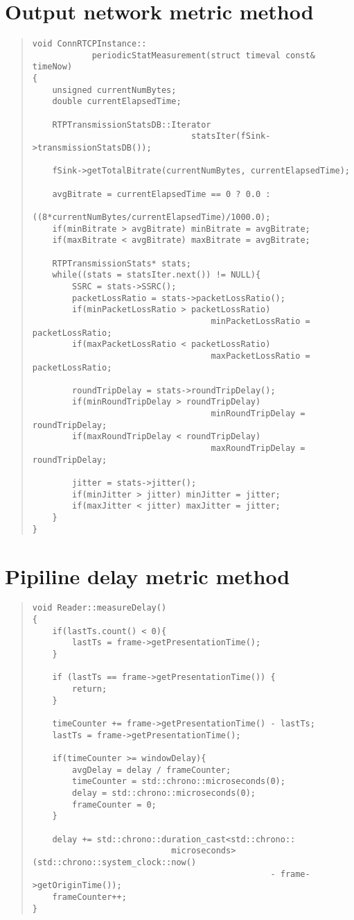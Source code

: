 \section{Output network metric method}\label{onmm}


\begin{quote}
\begin{verbatim}
void ConnRTCPInstance::
			periodicStatMeasurement(struct timeval const& timeNow) 
{
    unsigned currentNumBytes;
    double currentElapsedTime;

    RTPTransmissionStatsDB::Iterator 
    							statsIter(fSink->transmissionStatsDB());

    fSink->getTotalBitrate(currentNumBytes, currentElapsedTime);

    avgBitrate = currentElapsedTime == 0 ? 0.0 :
    					((8*currentNumBytes/currentElapsedTime)/1000.0);
    if(minBitrate > avgBitrate) minBitrate = avgBitrate;
    if(maxBitrate < avgBitrate) maxBitrate = avgBitrate;

    RTPTransmissionStats* stats;
    while((stats = statsIter.next()) != NULL){
        SSRC = stats->SSRC();
        packetLossRatio = stats->packetLossRatio();
        if(minPacketLossRatio > packetLossRatio) 
        							minPacketLossRatio = packetLossRatio;
        if(maxPacketLossRatio < packetLossRatio) 
        							maxPacketLossRatio = packetLossRatio;        
        
        roundTripDelay = stats->roundTripDelay();
        if(minRoundTripDelay > roundTripDelay) 
        							minRoundTripDelay = roundTripDelay;
        if(maxRoundTripDelay < roundTripDelay) 
        							maxRoundTripDelay = roundTripDelay;

        jitter = stats->jitter();
        if(minJitter > jitter) minJitter = jitter;
        if(maxJitter < jitter) maxJitter = jitter;
    }
}
\end{verbatim}
\end{quote} 
\section{Pipiline delay metric method}\label{pdmm}


\begin{quote}
\begin{verbatim}
void Reader::measureDelay()
{
    if(lastTs.count() < 0){
        lastTs = frame->getPresentationTime();
    }

    if (lastTs == frame->getPresentationTime()) {
        return;
    }

    timeCounter += frame->getPresentationTime() - lastTs;
    lastTs = frame->getPresentationTime();

    if(timeCounter >= windowDelay){
        avgDelay = delay / frameCounter;
        timeCounter = std::chrono::microseconds(0);
        delay = std::chrono::microseconds(0);
        frameCounter = 0;
    }
    
    delay += std::chrono::duration_cast<std::chrono::
    						microseconds>(std::chrono::system_clock::now() 
    											- frame->getOriginTime());
    frameCounter++;
}
\end{verbatim}
\end{quote} 

